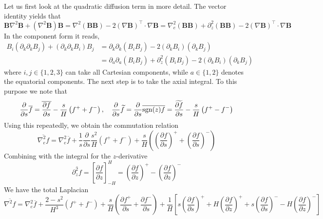 Let us first look at the quadratic diffusion term in more detail. The vector identity yields that
\[
    \mathbf{B} \nabla^2 \mathbf{B} + (\nabla^2 \mathbf{B}) \mathbf{B} = \nabla^2 (\mathbf{B}\mathbf{B}) - 2 (\nabla\mathbf{B})^\intercal \cdot \nabla \mathbf{B} = \nabla_e^2 (\mathbf{B} \mathbf{B}) + \partial_z^2 (\mathbf{B}\mathbf{B}) - 2 (\nabla \mathbf{B})^\intercal \cdot \nabla \mathbf{B}
\]
In the component form it reads,
\[\begin{aligned}
    B_i (\partial_k \partial_k B_j) + (\partial_k \partial_k B_i) B_j &= \partial_k \partial_k (B_i B_j) - 2 (\partial_k B_i) (\partial_k B_j) \\ 
    &= \partial_a \partial_a (B_i B_j) + \partial_z^2 (B_i B_j) - 2 (\partial_k B_i) (\partial_k B_j)
\end{aligned}\]
where $i,j\in \{1,2,3\}$ can take all Cartesian components, while $a \in \{1,2\}$ denotes the equatorial components. The next step is to take the axial integral. To this purpose we note that
\[
    \frac{\partial}{\partial s} \overline{f} = \overline{\frac{\partial f}{\partial s}} - \frac{s}{H} \left(f^+ + f^-\right),\quad 
    \frac{\partial}{\partial s} \widetilde{f} = \frac{\partial}{\partial s} \overline{\operatorname{sgn}(z)f} = \widetilde{\frac{\partial f}{\partial s}} - \frac{s}{H} \left(f^+ - f^-\right)
\]
Using this repeatedly, we obtain the commutation relation
\[
    \overline{\nabla_e^2 f} = \nabla_e^2 \overline{f} + \frac{1}{s}\frac{\partial}{\partial s}\frac{s^2}{H} \left(f^+ + f^-\right) + \frac{s}{H}\left(\left(\frac{\partial f}{\partial s}\right)^+ + \left(\frac{\partial f}{\partial s}\right)^-\right)
\]
Combining with the integral for the $z$-derivative
\[
    \overline{\partial_z^2 f} = \left[\frac{\partial f}{\partial z}\right]^H_{-H} = \left(\frac{\partial f}{\partial z}\right)^+ - \left(\frac{\partial f}{\partial z}\right)^-
\]
We have the total Laplacian
\[
    \overline{\nabla^2 f} = \nabla_e^2 \overline{f} + \frac{2 - s^2}{H^3} \left(f^+ + f^-\right) + \frac{s}{H} \left(\frac{\partial f^+}{\partial s} + \frac{\partial f^-}{\partial s}\right) + \frac{1}{H} \left[s\left(\frac{\partial f}{\partial s}\right)^+ + H \left(\frac{\partial f}{\partial z}\right)^+ + s\left(\frac{\partial f}{\partial s}\right)^- - H \left(\frac{\partial f}{\partial z}\right)^-\right]
\]

